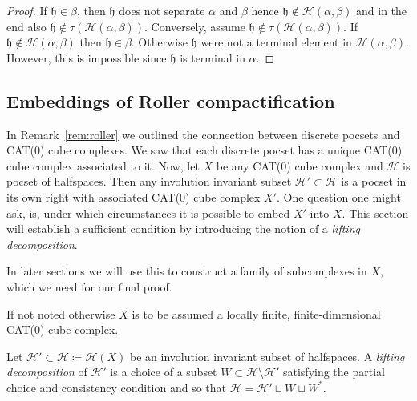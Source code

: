 \begin{proof}
  If \(\mathfrak{h} \in \beta\), then \(\mathfrak{h}\) does not separate \(\alpha\) and \(\beta\) hence \(\mathfrak{h} \notin \mathcal{H}(\alpha, \beta)\) and in the end also \(\mathfrak{h} \notin \tau(\mathcal{H}(\alpha, \beta))\). Conversely, assume \(\mathfrak{h} \notin \tau(\mathcal{H}(\alpha, \beta))\). If \(\mathfrak{h} \notin \mathcal{H}(\alpha, \beta)\) then \(\mathfrak{h} \in \beta\). Otherwise \(\mathfrak{h}\) were not a terminal element in \(\mathcal{H}(\alpha, \beta)\). However, this is impossible since \(\mathfrak{h}\) is terminal in \(\alpha\).
\end{proof}

\subsection{Embeddings of Roller compactification}
\label{sec:embedding-roller}
In Remark~\ref{rem:roller} we outlined the connection between discrete pocsets and CAT(0) cube complexes. We saw that each discrete pocset has a unique CAT(0) cube complex associated to it. Now, let \(X\) be any CAT(0) cube complex and \(\mathcal{H}\) is pocset of halfspaces. Then any involution invariant subset \(\mathcal{H}' \subset \mathcal{H}\) is a pocset in its own right with associated CAT(0) cube complex \(X'\). One question one might ask, is, under which circumstances it is possible to embed \(X'\) into \(X\). This section will establish a sufficient condition by introducing the notion of a \emph{lifting decomposition}.

In later sections we will use this to construct a family of subcomplexes in \(X\), which we need for our final proof.

If not noted otherwise \(X\) is to be assumed a locally finite, finite-dimensional CAT(0) cube complex.

\begin{defin}
  Let \(\mathcal{H}' \subset \mathcal{H} \coloneqq \mathcal{H}(X)\) be an involution invariant subset of halfspaces. A \emph{lifting decomposition} of \(\mathcal{H}'\) is a choice of a subset \(W \subset \mathcal{H} \setminus \mathcal{H}'\) satisfying the partial choice and consistency condition and so that \(\mathcal{H} = \mathcal{H}' \sqcup W \sqcup W^\ast\).
\end{defin}


